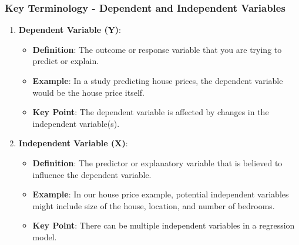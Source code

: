 \documentclass{beamer}
\begin{document}
\begin{frame}[fragile]
    \frametitle{Key Terminology - Dependent and Independent Variables}
    \begin{enumerate}
        \item \textbf{Dependent Variable (Y)}:
            \begin{itemize}
                \item \textbf{Definition}: The outcome or response variable that you are trying to predict or explain.
                \item \textbf{Example}: In a study predicting house prices, the dependent variable would be the house price itself.
                \item \textbf{Key Point}: The dependent variable is affected by changes in the independent variable(s).
            \end{itemize}
        \item \textbf{Independent Variable (X)}:
            \begin{itemize}
                \item \textbf{Definition}: The predictor or explanatory variable that is believed to influence the dependent variable.
                \item \textbf{Example}: In our house price example, potential independent variables might include size of the house, location, and number of bedrooms.
                \item \textbf{Key Point}: There can be multiple independent variables in a regression model.
            \end{itemize}
    \end{enumerate}
\end{frame}
\end{document}
